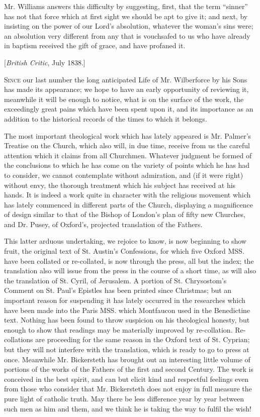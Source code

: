 Mr. Williams answers this difficulty by suggesting,
first, that the term ``sinner'' has not that force which at first
sight we should be apt to give it; and next, by insisting on the power
of our Lord's absolution, whatever the woman's sins were; an absolution
very different from any that is vouchsafed to us who have already in
baptism received the gift of grace, and have profaned it.


[\emph{British Critic}, July 1838.]

S\textsc{ince} our last number
the long anticipated Life of Mr. Wilberforce by his Sons has made its
appearance; we hope to have an early opportunity of reviewing it,
meanwhile it will be enough to notice, what is on the surface of the
work, the exceedingly great pains which have been spent upon it, and its
importance as an addition to the historical records of the times to
which it belongs.

The most important theological work which has
lately appeared is Mr. Palmer's Treatise on the Church, which also will,
in due time, receive from us the careful attention which it claims from
all Churchmen. Whatever judgment be formed of the conclusions to which
he has come on the variety of points which he has had to consider, we
cannot contemplate without admiration, and (if it were right) without
envy, the thorough treatment which his subject has received at his
hands. It is indeed a work quite in character with the religious
movement which has lately commenced in different parts of the Church,
displaying a magnificence of design similar to that of the Bishop of
London's plan of fifty new Churches, and Dr. Pusey, of Oxford's, projected
translation of the Fathers.

This latter arduous undertaking, we rejoice to
know, is now beginning to show fruit, the original text of St. Austin's
Confessions, for which five Oxford MSS. have been collated or
re-collated, is now through the press, all but the index; the
translation also will issue from the press in the course of a short
time, as will also the translation of St. Cyril, of Jerusalem. A portion
of St. Chrysostom's Comment on St. Paul's Epistles has been printed
since Christmas; but an important reason for suspending it has lately
occurred in the researches which have been made into the Paris MSS.
which Montfaucon used in the Benedictine text. Nothing has been found to
throw suspicion on his theological honesty, but enough to show that
readings may be materially improved by re-collation. Re-collations are
proceeding for the same reason in the Oxford text of St. Cyprian; but
they will not interfere with the translation, which is ready to go to
press at once. Meanwhile Mr. Bickersteth has brought out an interesting
little volume of portions of the works of the Fathers of the first and
second Century. The work is conceived in the best spirit, and can but
elicit kind and respectful feelings even from those who consider that
Mr. Bickersteth does not enjoy in full measure the pure light of
catholic truth. May there be less difference year by year between
such men as him and them, and we think he is taking the way to fulfil
the wish!


